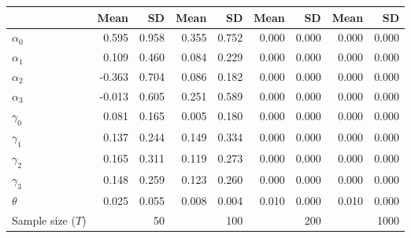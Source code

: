 
\begin{tabular}[t]{lrrrrrrrr}
\toprule
  & Mean & SD & Mean  & SD  & Mean   & SD   & Mean    & SD   \\
\midrule
$\alpha_{0}$ & 0.595 & 0.958 & 0.355 & 0.752 & 0.000 & 0.000 & 0.000 & 0.000\\
$\alpha_{1}$ & 0.109 & 0.460 & 0.084 & 0.229 & 0.000 & 0.000 & 0.000 & 0.000\\
$\alpha_{2}$ & -0.363 & 0.704 & 0.086 & 0.182 & 0.000 & 0.000 & 0.000 & 0.000\\
$\alpha_{3}$ & -0.013 & 0.605 & 0.251 & 0.589 & 0.000 & 0.000 & 0.000 & 0.000\\
$\gamma_{0}$ & 0.081 & 0.165 & 0.005 & 0.180 & 0.000 & 0.000 & 0.000 & 0.000\\
$\gamma_{1}$ & 0.137 & 0.244 & 0.149 & 0.334 & 0.000 & 0.000 & 0.000 & 0.000\\
$\gamma_{2}$ & 0.165 & 0.311 & 0.119 & 0.273 & 0.000 & 0.000 & 0.000 & 0.000\\
$\gamma_{3}$ & 0.148 & 0.259 & 0.123 & 0.260 & 0.000 & 0.000 & 0.000 & 0.000\\
$\theta$ & 0.025 & 0.055 & 0.008 & 0.004 & 0.010 & 0.000 & 0.010 & 0.000\\
Sample size ($T$) &  & 50 &  & 100 &  & 200 &  & 1000\\
\bottomrule
\end{tabular}
